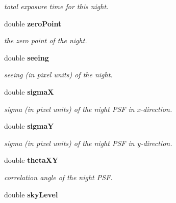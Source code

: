 \begin{CompactItemize}
\begin{CompactList}\small\item\em total exposure time for this night.\item\end{CompactList}\item 
{}
double {\bf zero\-Point}\label{class_night_m5}

\begin{CompactList}\small\item\em the zero point of the night.\item\end{CompactList}\item 
{}
double {\bf seeing}\label{class_night_m6}

\begin{CompactList}\small\item\em seeing (in pixel units) of the night.\item\end{CompactList}\item 
{}
double {\bf sigma\-X}\label{class_night_m7}

\begin{CompactList}\small\item\em sigma (in pixel units) of the night PSF in x-direction.\item\end{CompactList}\item 
{}
double {\bf sigma\-Y}\label{class_night_m8}

\begin{CompactList}\small\item\em sigma (in pixel units) of the night PSF in y-direction.\item\end{CompactList}\item 
{}
double {\bf theta\-XY}\label{class_night_m9}

\begin{CompactList}\small\item\em correlation angle of the night PSF.\item\end{CompactList}\item 
{}
double {\bf sky\-Level}\label{class_night_m10}


\end{CompactItemize}
